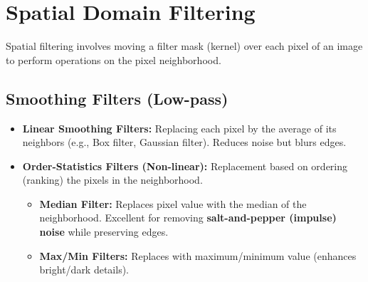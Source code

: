 \documentclass[12pt,a4paper]{article}
\begin{document}
\section{Spatial Domain Filtering}

Spatial filtering involves moving a filter mask (kernel) over each pixel of an image to perform operations on the pixel neighborhood.

\subsection{Smoothing Filters (Low-pass)}
\begin{itemize}[leftmargin=*, itemsep=3.5pt]
  \item \textbf{Linear Smoothing Filters:} Replacing each pixel by the average of its neighbors (e.g., Box filter, Gaussian filter). Reduces noise but blurs edges.
  \item \textbf{Order-Statistics Filters (Non-linear):} Replacement based on ordering (ranking) the pixels in the neighborhood.
    \begin{itemize}[leftmargin=1.5em, itemsep=1.5pt]
      \item \textbf{Median Filter:} Replaces pixel value with the median of the neighborhood. Excellent for removing \textbf{salt-and-pepper (impulse) noise} while preserving edges.
      \item \textbf{Max/Min Filters:} Replaces with maximum/minimum value (enhances bright/dark details).
    \end{itemize}
\end{itemize}
\end{document}
